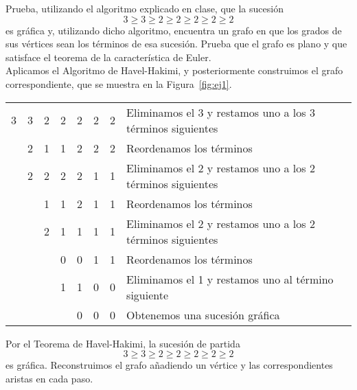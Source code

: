 \documentclass[12pt]{article}
\begin{document}
    \begin{ejercicio}[1 punto]
        Prueba, utilizando el algoritmo explicado en clase, que la sucesión $$3 \ge 3 \ge 2 \ge 2 \ge 2 \ge 2 \ge 2$$ es gráfica y, utilizando dicho algoritmo, encuentra un grafo en que los grados de sus vértices sean los términos de esa sucesión. 
        Prueba que el grafo es plano y que satisface el teorema de la característica de Euler. \\

        Aplicamos el Algoritmo de Havel-Hakimi, y posteriormente construimos el grafo correspondiente, que se muestra en la Figura~\ref{fig:ej1}.

        \begin{table}[H]
            \centering
            \begin{tabular}{ccccccc|l}
                3 & 3 & 2 & 2 & 2 & 2 & 2 & Eliminamos el 3 y restamos uno a los 3 términos siguientes\\
                  & 2 & 1 & 1 & 2 & 2 & 2 & Reordenamos los términos\\
                  & 2 & 2 & 2 & 2 & 1 & 1 & Eliminamos el 2 y restamos uno a los 2 términos siguientes\\
                  &   & 1 & 1 & 2 & 1 & 1 & Reordenamos los términos\\
                  &   & 2 & 1 & 1 & 1 & 1 & Eliminamos el 2 y restamos uno a los 2 términos siguientes\\
                  &   &   & 0 & 0 & 1 & 1 & Reordenamos los términos\\
                  &   &   & 1 & 1 & 0 & 0 & Eliminamos el 1 y restamos uno al término siguiente\\
                  &   &   &   & 0 & 0 & 0 & Obtenemos una sucesión gráfica
            \end{tabular}
        \end{table}
        Por el Teorema de Havel-Hakimi, la sucesión de partida $$3 \ge 3 \ge 2 \ge 2 \ge 2 \ge 2 \ge 2$$ es gráfica. Reconstruimos el grafo añadiendo un vértice y las correspondientes aristas en cada paso.

        \begin{figure}[H]
            \centering
            \label{fig:ej11}
        \end{figure}


\end{ejercicio}
\end{document}
